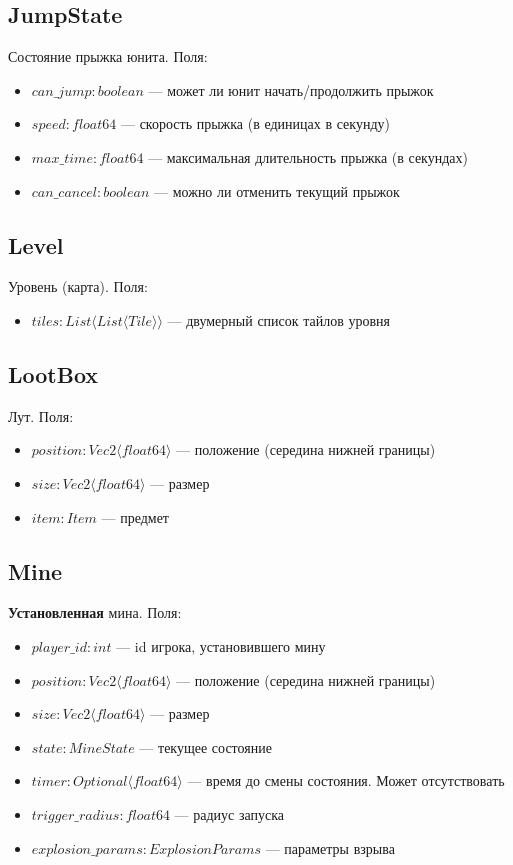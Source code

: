 \subsection{JumpState}
Состояние прыжка юнита. Поля:
\begin{itemize}
    \item $can\_jump : boolean$ --- может ли юнит начать/продолжить прыжок
    \item $speed : float64$ --- скорость прыжка (в единицах в секунду)
    \item $max\_time : float64$ --- максимальная длительность прыжка (в секундах)
    \item $can\_cancel : boolean$ --- можно ли отменить текущий прыжок
\end{itemize}

\subsection{Level}
Уровень (карта). Поля:
\begin{itemize}
    \item $tiles : List \langle List \langle Tile \rangle \rangle$ --- двумерный список тайлов уровня
\end{itemize}

\subsection{LootBox}
Лут. Поля:
\begin{itemize}
    \item $position : Vec2 \langle float64 \rangle$ --- положение (середина нижней границы)
    \item $size : Vec2 \langle float64 \rangle$ --- размер
    \item $item : Item$ --- предмет
\end{itemize}

\subsection{Mine}
\textbf{Установленная} мина. Поля:
\begin{itemize}
    \item $player\_id : int$ --- id игрока, установившего мину
    \item $position : Vec2 \langle float64 \rangle$ --- положение (середина нижней границы)
    \item $size : Vec2 \langle float64 \rangle$ --- размер
    \item $state : MineState$ --- текущее состояние
    \item $timer : Optional \langle float64 \rangle$ --- время до смены состояния. Может отсутствовать
    \item $trigger\_radius : float64$ --- радиус запуска
    \item $explosion\_params : ExplosionParams$ --- параметры взрыва
\end{itemize}

